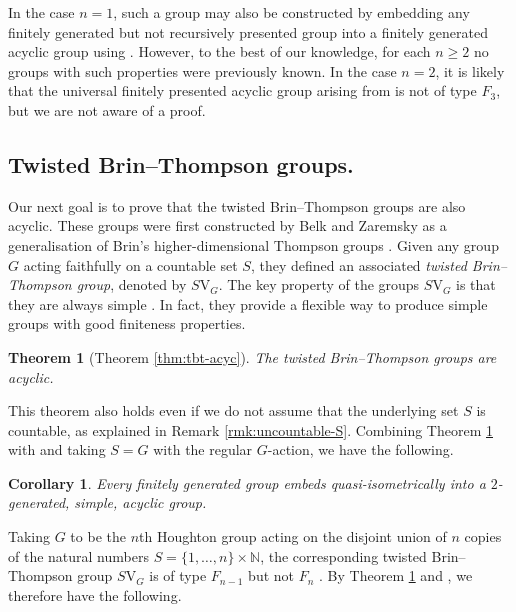 \documentclass[10pt,a4paper]{amsart}
\numberwithin{equation}{section}
\numberwithin{figure}{section}
\newtheorem{athm}{Theorem}
\newtheorem{cor}[thm]{Corollary}
\theoremstyle{definition}
\newcommand{\bN}{\mathbb{N}}
\newcommand{\V}{\mathrm{V}}
\renewcommand{\geq}{\geqslant}
\begin{document}
In the case $n=1$, such a group may also be constructed by embedding any finitely generated but not recursively presented group into a finitely generated acyclic group using \cite{BauDyHe80}. However, to the best of our knowledge, for each $n \geq 2$ no groups with such properties were previously known. In the case $n=2$, it is likely that the universal finitely presented acyclic group arising from \cite[Theorem E]{BauDyMi83} is not of type $F_3$, but we are not aware of a proof.


\subsection*{Twisted Brin--Thompson groups.}

Our next goal is to prove that the twisted Brin--Thompson groups are also acyclic. These groups were first constructed by Belk and Zaremsky \cite{BelkZaremsky22} as a generalisation of Brin's higher-dimensional Thompson groups \cite{Brin04}. Given any group $G$ acting faithfully on a countable set $S$, they defined an associated \emph{twisted Brin--Thompson group}, denoted by $S\V_G$. The key property of the groups $S\V_G$ is that they are always simple \cite[Theorem 3.4]{BelkZaremsky22}. In fact, they provide a flexible way to produce simple groups with good finiteness properties.

\begin{athm}[Theorem \ref{thm:tbt-acyc}]
\label{thm:acyclic-t-br-thom}
The twisted Brin--Thompson groups are acyclic. 
\end{athm}

This theorem also holds even if we do not assume that the underlying set $S$ is countable, as explained in Remark \ref{rmk:uncountable-S}. Combining Theorem \ref{thm:acyclic-t-br-thom} with \cite[Theorems A, B, 3.4]{BelkZaremsky22} and taking $S=G$ with the regular $G$-action, we have the following.

\begin{cor}
Every finitely generated group embeds quasi-isometrically into a $2$-generated, simple, acyclic group. 
\end{cor}

Taking $G$ to be the $n$th Houghton group acting on the disjoint union of $n$ copies of the natural numbers $S = \{1,\ldots,n\} \times \bN$, the corresponding twisted Brin--Thompson group $S\V_G$ is of type $F_{n-1}$ but not $F_n$ \cite[Corollary G]{BelkZaremsky22}. By Theorem \ref{thm:acyclic-t-br-thom} and \cite[Theorem 3.4]{BelkZaremsky22}, we therefore have the following.
\end{document}

